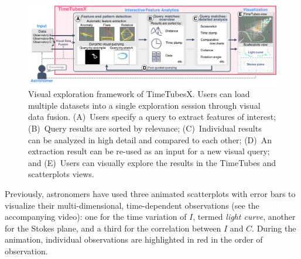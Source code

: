 \begin{figure}
    \centering
    \includegraphics[width=.99\linewidth]{vgtc_journal_latex/figures/workflowGray.pdf}
    \caption{Visual exploration framework of TimeTubesX. Users can load multiple datasets into a single exploration session through visual data fusion. (A)~Users specify a query to extract features of interest; (B)~Query results are sorted by relevance; (C)~Individual results can be analyzed in high detail and compared to each other; (D)~An extraction result can be re-used as an input for a new visual query; and (E)~Users can visually explore the results in the TimeTubes and scatterplots views.}
    \label{fig:framework}
\end{figure}
Previously, astronomers have used three animated scatterplots with error bars to visualize their multi-dimensional, time-dependent observations (see the accompanying video): one for the time variation of $I$, termed \textit{light curve}, another for the Stokes plane, and a third for the correlation between $I$ and $C$.
During the animation, individual observations are highlighted in red in the order of observation.
%

